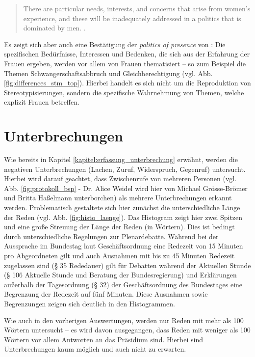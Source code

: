 \documentclass[12pt, 
    twoside=false, 
    bibliography=totoc, 
    numbers=endperiod, 
    headings=normal, 
    toc=chapterentrydotfill
    ]{scrbook}
\begin{document}
\begin{quote}
    There are particular needs, interests, and concerns that arise from women's experience, and these will be inadequately addressed in a politics that is dominated by men. \parencite[66]{phillips_1998}.
\end{quote}

Es zeigt sich aber auch eine Bestätigung der \emph{politics of presence} von \textcite{phillips_1998}: Die spezifischen Bedürfnisse, Interessen und Bedenken, die sich aus der Erfahrung der Frauen ergeben, werden vor allem von Frauen thematisiert -- so zum Beispiel die Themen Schwangerschaftsabbruch und Gleichberechtigung (vgl. Abb. \ref{fig:differences_stm_top}). Hierbei handelt es sich nicht um die Reproduktion von Stereotypisierungen, sondern die spezifische Wahrnehmung von Themen, welche explizit Frauen betreffen.


\section{Unterbrechungen}\label{kapitel:auswertung_unterbrechung}

Wie bereits in Kapitel \ref{kapitel:erfassung_unterbrechung} erwähnt, werden die negativen Unterbrechungen (Lachen, Zuruf, Widerspruch, Gegenruf) untersucht. Hierbei wird darauf geachtet, dass Zwischenrufe von mehreren Personen (vgl. Abb. \ref{fig:protokoll_bsp} - Dr. Alice Weidel wird hier von Michael Grösse-Brömer und Britta Haßelmann unterborchen) als mehrere Unterbrechungen erkannt werden. Problematisch gestaltete sich hier zunächst die unterschiedliche Länge der Reden (vgl. Abb. \ref{fig:histo_laenge}). Das Histogram zeigt hier zwei Spitzen und eine große Streuung der Länge der Reden (in Wörtern).
Dies ist bedingt durch unterschiedliche Regelungen zur Plenardebatte. Während bei der Aussprache  im Bundestag laut Geschäftsordnung eine Redezeit von 15 Minuten pro Abgeordneten gilt und auch Ausnahmen mit bis zu 45 Minuten Redezeit zugelassen sind (§ 35 Rededauer) gilt für Debatten während der Aktuellen Stunde (§ 106 Aktuelle Stunde und Beratung der Bundesregierung) und Erklärungen außerhalb der Tagesordnung (§ 32) der Geschäftsordnung des Bundestages \parencite{bundestag_2019} eine Begrenzung der Redezeit auf fünf Minuten. Diese Ausnahmen sowie Begrenzungen zeigen sich deutlich in den Histogrammen.

Wie auch in den vorherigen Auswertungen, werden nur Reden mit mehr als 100 Wörtern untersucht -- es wird davon ausgegangen, dass Reden mit weniger als 100 Wörtern vor allem Antworten an das Präsidium sind. Hierbei sind Unterbrechungen kaum möglich und auch nicht zu erwarten.
\end{document}
